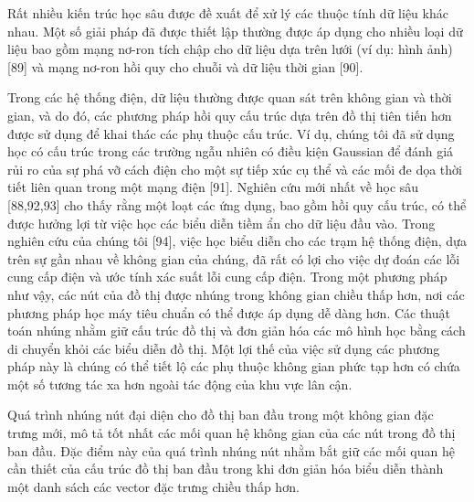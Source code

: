 \documentclass[utf8]{frontiersSCNS} %
\begin{document}
Rất nhiều kiến trúc học sâu được đề xuất để xử lý các thuộc tính dữ liệu khác nhau. Một số giải pháp đã được thiết lập thường được áp dụng cho nhiều loại dữ liệu bao gồm mạng nơ-ron tích chập cho dữ liệu dựa trên lưới (ví dụ: hình ảnh) [89] và mạng nơ-ron hồi quy cho chuỗi và dữ liệu thời gian [90].

Trong các hệ thống điện, dữ liệu thường được quan sát trên không gian và thời gian, và do đó, các phương pháp hồi quy cấu trúc dựa trên đồ thị tiên tiến hơn được sử dụng để khai thác các phụ thuộc cấu trúc. Ví dụ, chúng tôi đã sử dụng học có cấu trúc trong các trường ngẫu nhiên có điều kiện Gaussian để đánh giá rủi ro của sự phá vỡ cách điện cho một sự tiếp xúc cụ thể và các mối đe dọa thời tiết liên quan trong một mạng điện [91]. Nghiên cứu mới nhất về học sâu [88,92,93] cho thấy rằng một loạt các ứng dụng, bao gồm hồi quy cấu trúc, có thể được hưởng lợi từ việc học các biểu diễn tiềm ẩn cho dữ liệu đầu vào. Trong nghiên cứu của chúng tôi [94], việc học biểu diễn cho các trạm hệ thống điện, dựa trên sự gần nhau về không gian của chúng, đã rất có lợi cho việc dự đoán các lỗi cung cấp điện và ước tính xác suất lỗi cung cấp điện. Trong một phương pháp như vậy, các nút của đồ thị được nhúng trong không gian chiều thấp hơn, nơi các phương pháp học máy tiêu chuẩn có thể được áp dụng dễ dàng hơn. Các thuật toán nhúng nhằm giữ cấu trúc đồ thị và đơn giản hóa các mô hình học bằng cách di chuyển khỏi các biểu diễn đồ thị. Một lợi thế của việc sử dụng các phương pháp này là chúng có thể tiết lộ các phụ thuộc không gian phức tạp hơn có chứa một số tương tác xa hơn ngoài tác động của khu vực lân cận.

Quá trình nhúng nút đại diện cho đồ thị ban đầu trong một không gian đặc trưng mới, mô tả tốt nhất các mối quan hệ không gian của các nút trong đồ thị ban đầu. Đặc điểm này của quá trình nhúng nút nhằm bắt giữ các mối quan hệ cần thiết của cấu trúc đồ thị ban đầu trong khi đơn giản hóa biểu diễn thành một danh sách các vector đặc trưng chiều thấp hơn.
\end{document}
